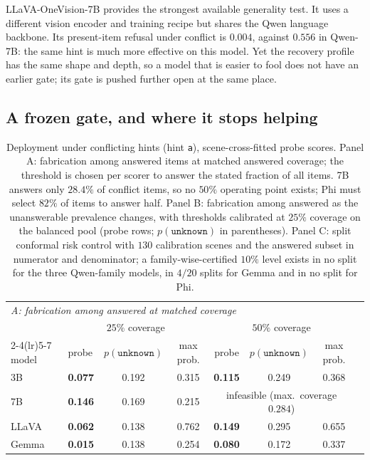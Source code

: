 \documentclass[10pt]{article}
\newcommand{\unknown}{\texttt{unknown}}
\newcommand{\punk}{p(\unknown)}
\begin{document}
LLaVA-OneVision-7B provides the strongest available generality test. It uses a different vision encoder and training recipe but shares the Qwen language backbone. Its present-item refusal under conflict is $0.004$, against $0.556$ in Qwen-7B: the same hint is much more effective on this model. Yet the recovery profile has the same shape and depth, so a model that is easier to fool does not have an earlier gate; its gate is pushed further open at the same place.

\subsection{A frozen gate, and where it stops helping}
\label{sec:deploy}

\begin{table}[t]
\centering
\small
\setlength{\tabcolsep}{4pt}
\caption{Deployment under conflicting hints (hint \texttt{a}), scene-cross-fitted probe scores. Panel A: fabrication among answered items at matched answered coverage; the threshold is chosen per scorer to answer the stated fraction of all items. 7B answers only $28.4\%$ of conflict items, so no $50\%$ operating point exists; Phi must select $82\%$ of items to answer half. Panel B: fabrication among answered as the unanswerable prevalence changes, with thresholds calibrated at $25\%$ coverage on the balanced pool (probe rows; $\punk$ in parentheses). Panel C: split conformal risk control with $130$ calibration scenes and the answered subset in numerator and denominator; a family-wise-certified $10\%$ level exists in no split for the three Qwen-family models, in $4/20$ splits for Gemma and in no split for Phi.}
\label{tab:deploy}
\begin{tabular}{llcccccc}
\toprule
\multicolumn{8}{l}{\emph{A: fabrication among answered at matched coverage}}\\
& \multicolumn{3}{c}{$25\%$ coverage} & \multicolumn{3}{c}{$50\%$ coverage} & \\
\cmidrule(lr){2-4}\cmidrule(lr){5-7}
model & probe & $\punk$ & max prob. & probe & $\punk$ & max prob. & \\
\midrule
3B & \textbf{0.077} & 0.192 & 0.315 & \textbf{0.115} & 0.249 & 0.368 & \\
7B & \textbf{0.146} & 0.169 & 0.215 & \multicolumn{3}{c}{infeasible (max.\ coverage $0.284$)} & \\
LLaVA & \textbf{0.062} & 0.138 & 0.762 & \textbf{0.149} & 0.295 & 0.655 & \\
Gemma & \textbf{0.015} & 0.138 & 0.254 & \textbf{0.080} & 0.172 & 0.337 & \\

\end{tabular}
\end{table}
\end{document}
